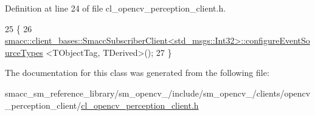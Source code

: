 Definition at line 24 of file cl\+\_\+opencv\+\_\+perception\+\_\+client.\+h.


\begin{DoxyCode}
25   \{
26     
      \hyperlink{classsmacc_1_1client__bases_1_1SmaccSubscriberClient}{smacc::client\_bases::SmaccSubscriberClient<std\_msgs::Int32>::configureEventSourceTypes}
      <TObjectTag, TDerived>();
27   \}
\end{DoxyCode}


The documentation for this class was generated from the following file\+:\begin{DoxyCompactItemize}
\item 
smacc\+\_\+sm\+\_\+reference\+\_\+library/sm\+\_\+opencv\+\_/include/sm\+\_\+opencv\+\_/clients/opencv\+\_\+perception\+\_\+client/\hyperlink{2_2include_2sm__opencv__2_2clients_2opencv__perception__client_2cl__opencv__perception__client_8h}{cl\+\_\+opencv\+\_\+perception\+\_\+client.\+h}\end{DoxyCompactItemize}
